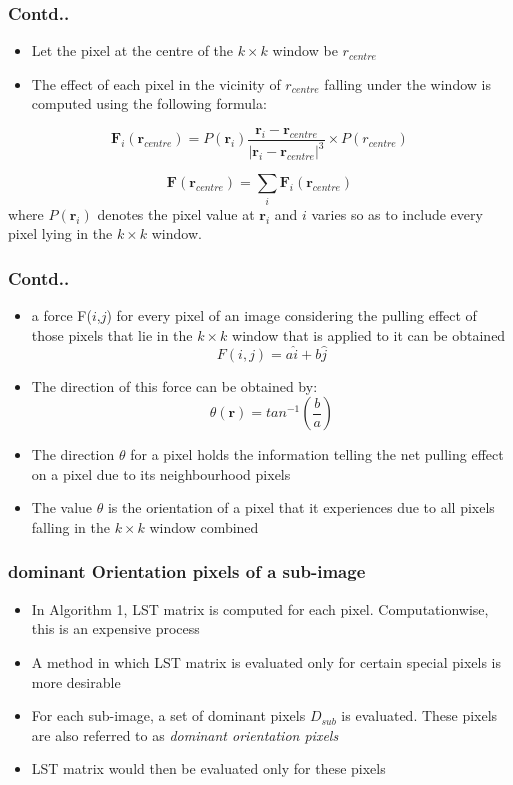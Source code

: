 \documentclass{beamer}
\begin{document}
\begin{frame}
	\frametitle{Contd..}
	\begin{itemize}	
	\item Let the pixel at the centre of the $k \times k$ window be $r_{centre}$ 
	\item The effect of each pixel in the vicinity of $r_{centre}$ falling under the window is computed using the following formula:
	\end{itemize}
	\begin{equation}
\textbf{F}_i(\textbf{r}_{centre}) = P(\textbf{r}_i) \frac{\textbf{r}_i - \textbf{r}_{centre}}{|\textbf{r}_i - \textbf{r}_{centre}|^{3}} \times P({r}_{centre})
 \end{equation}
 
\begin{equation}
\textbf{F}(\textbf{r}_{centre}) =  \sum_i \textbf{F}_i(\textbf{r}_{centre})
 \end{equation}
where $P(\textbf{r}_i)$ denotes the pixel value at $\textbf{r}_i$ and $i$ varies so as to include every pixel lying in the $k \times k$ window.
\end{frame}


\begin{frame}
	\frametitle{Contd..}
	\begin{itemize}
		\item a force F($i$,$j$) for every pixel of an image considering the 
pulling effect of those pixels that lie in the $k \times k$ window that is applied to it can be obtained
\begin{equation}
F(i,j) = a \hat{i} +  b \hat{j}
\end{equation} 
		\item The direction of this force can be obtained by:
\begin{equation}
\theta(\textbf{r}) = tan^{-1} (\frac{b}{a})
\end{equation}
		\item The direction $\theta$ for a pixel holds the information telling the net pulling effect on a pixel due to its neighbourhood pixels
		\item The value $\theta$ is the orientation of a pixel that it experiences due to all pixels falling in the $k \times k$ window combined
	\end{itemize}
\end{frame}


\begin{frame}
\frametitle{dominant Orientation pixels of a sub-image}
\begin{itemize}
		\item In Algorithm 1, LST matrix is computed for each pixel. Computationwise, this is an expensive process 
		\item A method in which LST matrix is evaluated only for certain special pixels is more desirable 
		\item For each sub-image, a set of dominant pixels $D_{sub}$ is evaluated. These pixels are also referred to as \emph{dominant orientation pixels} 
		\item LST matrix would then be evaluated only for these pixels
	\end{itemize}
\end{frame}
\end{document}
